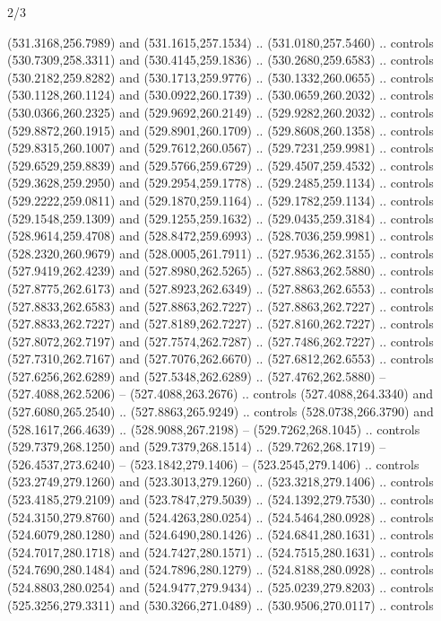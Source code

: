 \begin{flagdescription}{2/3}
\begin{scope}[xshift=0.5\flaglength,yshift=0.5\flagwidth,scale=\flagwidth/495.65]
\begin{scope}[y=0.8pt, x=0.8pt, yscale=-1,shift={(-463.76,-309.78)}]
  (531.3168,256.7989) and (531.1615,257.1534) .. (531.0180,257.5460) .. controls
  (530.7309,258.3311) and (530.4145,259.1836) .. (530.2680,259.6583) .. controls
  (530.2182,259.8282) and (530.1713,259.9776) .. (530.1332,260.0655) .. controls
  (530.1128,260.1124) and (530.0922,260.1739) .. (530.0659,260.2032) .. controls
  (530.0366,260.2325) and (529.9692,260.2149) .. (529.9282,260.2032) .. controls
  (529.8872,260.1915) and (529.8901,260.1709) .. (529.8608,260.1358) .. controls
  (529.8315,260.1007) and (529.7612,260.0567) .. (529.7231,259.9981) .. controls
  (529.6529,259.8839) and (529.5766,259.6729) .. (529.4507,259.4532) .. controls
  (529.3628,259.2950) and (529.2954,259.1778) .. (529.2485,259.1134) .. controls
  (529.2222,259.0811) and (529.1870,259.1164) .. (529.1782,259.1134) .. controls
  (529.1548,259.1309) and (529.1255,259.1632) .. (529.0435,259.3184) .. controls
  (528.9614,259.4708) and (528.8472,259.6993) .. (528.7036,259.9981) .. controls
  (528.2320,260.9679) and (528.0005,261.7911) .. (527.9536,262.3155) .. controls
  (527.9419,262.4239) and (527.8980,262.5265) .. (527.8863,262.5880) .. controls
  (527.8775,262.6173) and (527.8923,262.6349) .. (527.8863,262.6553) .. controls
  (527.8833,262.6583) and (527.8863,262.7227) .. (527.8863,262.7227) .. controls
  (527.8833,262.7227) and (527.8189,262.7227) .. (527.8160,262.7227) .. controls
  (527.8072,262.7197) and (527.7574,262.7287) .. (527.7486,262.7227) .. controls
  (527.7310,262.7167) and (527.7076,262.6670) .. (527.6812,262.6553) .. controls
  (527.6256,262.6289) and (527.5348,262.6289) .. (527.4762,262.5880) --
  (527.4088,262.5206) -- (527.4088,263.2676) .. controls (527.4088,264.3340) and
  (527.6080,265.2540) .. (527.8863,265.9249) .. controls (528.0738,266.3790) and
  (528.1617,266.4639) .. (528.9088,267.2198) -- (529.7262,268.1045) .. controls
  (529.7379,268.1250) and (529.7379,268.1514) .. (529.7262,268.1719) --
  (526.4537,273.6240) -- (523.1842,279.1406) -- (523.2545,279.1406) .. controls
  (523.2749,279.1260) and (523.3013,279.1260) .. (523.3218,279.1406) .. controls
  (523.4185,279.2109) and (523.7847,279.5039) .. (524.1392,279.7530) .. controls
  (524.3150,279.8760) and (524.4263,280.0254) .. (524.5464,280.0928) .. controls
  (524.6079,280.1280) and (524.6490,280.1426) .. (524.6841,280.1631) .. controls
  (524.7017,280.1718) and (524.7427,280.1571) .. (524.7515,280.1631) .. controls
  (524.7690,280.1484) and (524.7896,280.1279) .. (524.8188,280.0928) .. controls
  (524.8803,280.0254) and (524.9477,279.9434) .. (525.0239,279.8203) .. controls
  (525.3256,279.3311) and (530.3266,271.0489) .. (530.9506,270.0117) .. controls

\end{scope}
\end{scope}
\end{flagdescription}
